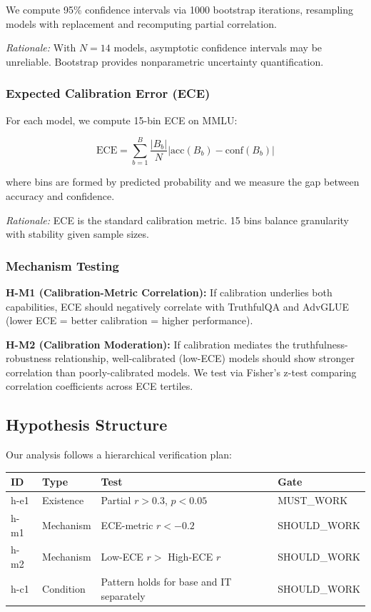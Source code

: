 We compute 95\% confidence intervals via 1000 bootstrap iterations, resampling models with replacement and recomputing partial correlation.

\emph{Rationale:} With $N=14$ models, asymptotic confidence intervals may be unreliable. Bootstrap provides nonparametric uncertainty quantification.

\subsubsection{Expected Calibration Error (ECE)}

For each model, we compute 15-bin ECE on MMLU:

\begin{equation}
\text{ECE} = \sum_{b=1}^{B} \frac{|B_b|}{N} |\text{acc}(B_b) - \text{conf}(B_b)|
\end{equation}

where bins are formed by predicted probability and we measure the gap between accuracy and confidence.

\emph{Rationale:} ECE is the standard calibration metric. 15 bins balance granularity with stability given sample sizes.

\subsubsection{Mechanism Testing}

\textbf{H-M1 (Calibration-Metric Correlation):} If calibration underlies both capabilities, ECE should negatively correlate with TruthfulQA and AdvGLUE (lower ECE = better calibration = higher performance).

\textbf{H-M2 (Calibration Moderation):} If calibration mediates the truthfulness-robustness relationship, well-calibrated (low-ECE) models should show stronger correlation than poorly-calibrated models. We test via Fisher's z-test comparing correlation coefficients across ECE tertiles.

\subsection{Hypothesis Structure}

Our analysis follows a hierarchical verification plan:

\begin{table}[h]
\centering
\begin{tabular}{llll}
\toprule
\textbf{ID} & \textbf{Type} & \textbf{Test} & \textbf{Gate} \\
\midrule
h-e1 & Existence & Partial $r > 0.3$, $p < 0.05$ & MUST\_WORK \\
h-m1 & Mechanism & ECE-metric $r < -0.2$ & SHOULD\_WORK \\
h-m2 & Mechanism & Low-ECE $r >$ High-ECE $r$ & SHOULD\_WORK \\
h-c1 & Condition & Pattern holds for base and IT separately & SHOULD\_WORK \\
\bottomrule
\end{tabular}
\end{table}

